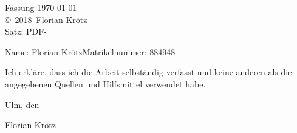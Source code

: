 \documentclass[a4paper,12pt,
headsepline,        %
oneside,            %
bibtotoc,           %
pointlessnumbers,   %
BCOR15mm             %
]{scrbook}
\newcommand{\fullname}{Florian Krötz}
\newcommand{\jahr}{2018}
\newcommand{\matnr}{884948}
\begin{document}
	
	\clearpage
	\thispagestyle{empty}
	{ \small
		\flushleft
		Fassung \today \\\vfill
		\copyright~\jahr~\fullname\\[0.5em]
		Satz: PDF-\LaTeXe
	}
	
	
	
	\setcounter{tocdepth}{2}
	\tableofcontents
	
	
	\mainmatter
	
	
	
	
	
	
	\appendix
	
	
	\backmatter
	
	
	
	
	\clearpage
	\thispagestyle{empty}
	
	Name: \fullname \hfill Matrikelnummer: \matnr \vspace{2cm}
	
	
	Ich erkläre, dass ich die Arbeit selbständig verfasst und keine anderen als die angegebenen Quellen und Hilfsmittel verwendet habe.\vspace{2cm}
	
	Ulm, den \dotfill
	
	\hspace{10cm} {\footnotesize \fullname}
\end{document}
